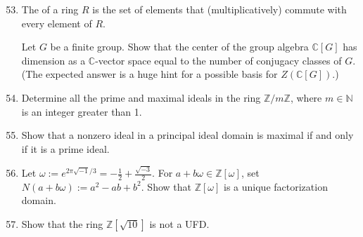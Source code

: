 \documentclass[12pt]{article}
\newcommand{\CC}{{\mathbb C}}
\newcommand{\NN}{{\mathbb N}}
\newcommand{\ZZ}{{\mathbb Z}}
\def\demph#1{\Maroon{{\sl #1}}}
\begin{document}
\normalsize
\begin{enumerate}
\setcounter{enumi}{52}  %
 

%
\item 
  The \demph{center $Z(R)$} of a ring $R$ is the set of elements that (multiplicatively) commute with every element
  of $R$.

  Let $G$ be a finite group.
      Show that the center of the group algebra $\CC[G]$ has dimension as a $\CC$-vector space equal to the 
      number of conjugacy classes of $G$.
      (The expected answer is a huge hint for a possible basis for $Z(\CC[G])$.)\vspace{-2pt}
\vspace{-2pt}

%
\item Determine all the prime and maximal ideals in the ring $\ZZ/m\ZZ$, where $m\in\NN$ is an integer greater than 1.
\vspace{-2pt}
 


%
\item Show that a nonzero ideal in a principal ideal domain is maximal if and only if it is a prime ideal.
\vspace{-2pt}
 

%
\item Let $\omega:=e^{2\pi\sqrt{-1}/3}=-\frac{1}{2}+\frac{\sqrt{-3}}{2}$.
      For $a+b\omega\in\ZZ[\omega]$, set $N(a+b\omega):=a^2-ab+b^2$.
      Show that $\ZZ[\omega]$ is a unique factorization domain.
\vspace{-2pt}


%
\item 
 Show that the ring $\ZZ[\sqrt{10}]$ is not a UFD.
\vspace{-2pt}


\end{enumerate}
\end{document}
